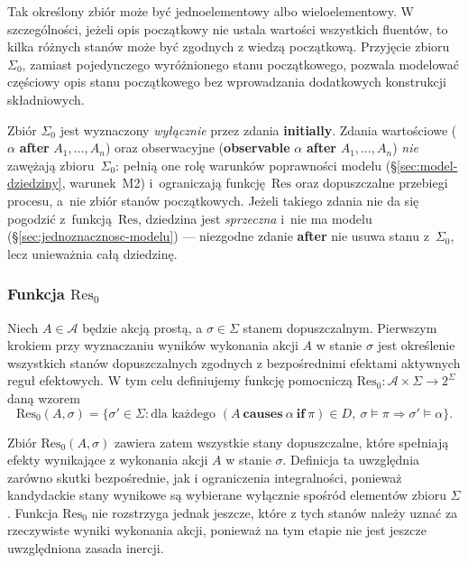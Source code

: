 \documentclass[11pt,a4paper]{article}
\newcommand{\aft}{\textbf{after}}
\newcommand{\initially}{\textbf{initially}}
\newcommand{\observable}{\textbf{observable}}
\theoremstyle{definition}
\begin{document}
Tak określony zbiór może być jednoelementowy albo wieloelementowy. W szczególności, jeżeli opis początkowy nie ustala wartości wszystkich fluentów, to kilka różnych stanów może być zgodnych z wiedzą początkową. Przyjęcie zbioru $\Sigma_0$, zamiast pojedynczego wyróżnionego stanu początkowego, pozwala modelować częściowy opis stanu początkowego bez wprowadzania dodatkowych konstrukcji składniowych.

Zbiór $\Sigma_0$ jest wyznaczony \emph{wyłącznie} przez zdania \initially{}. Zdania wartościowe ($\alpha$ \aft{} $A_1,\dots,A_n$) oraz obserwacyjne (\observable{} $\alpha$ \aft{} $A_1,\dots,A_n$) \emph{nie} zawężają zbioru~$\Sigma_0$: pełnią one rolę warunków poprawności modelu (\S\ref{sec:model-dziedziny}, warunek~M2) i~ograniczają funkcję~$\mathrm{Res}$ oraz dopuszczalne przebiegi procesu, a~nie zbiór stanów początkowych. Jeżeli takiego zdania nie da się pogodzić z~funkcją~$\mathrm{Res}$, dziedzina jest \emph{sprzeczna} i~nie ma modelu (\S\ref{sec:jednoznacznosc-modelu}) --- niezgodne zdanie \aft{} nie usuwa stanu z~$\Sigma_0$, lecz unieważnia całą dziedzinę.

\subsubsection{Funkcja \texorpdfstring{$\mathrm{Res}_0$}{Res0}}

Niech $A \in \mathcal{A}$ będzie akcją prostą, a $\sigma \in \Sigma$ stanem dopuszczalnym. Pierwszym krokiem przy wyznaczaniu wyników wykonania akcji $A$ w stanie $\sigma$ jest określenie wszystkich stanów dopuszczalnych zgodnych z bezpośrednimi efektami aktywnych reguł efektowych. W tym celu definiujemy funkcję pomocniczą $\mathrm{Res}_0 : \mathcal{A} \times \Sigma \to 2^{\Sigma}$ daną wzorem
\[
\mathrm{Res}_0(A,\sigma)=
\{\sigma' \in \Sigma :
\text{dla każdego } (A\ \textbf{causes}\ \alpha\ \textbf{if}\ \pi)\in D,\ 
\sigma \models \pi \Rightarrow \sigma' \models \alpha\}.
\]

Zbiór $\mathrm{Res}_0(A,\sigma)$ zawiera zatem wszystkie stany dopuszczalne, które spełniają efekty wynikające z wykonania akcji $A$ w stanie $\sigma$. Definicja ta uwzględnia zarówno skutki bezpośrednie, jak i ograniczenia integralności, ponieważ kandydackie stany wynikowe są wybierane wyłącznie spośród elementów zbioru $\Sigma$. Funkcja $\mathrm{Res}_0$ nie rozstrzyga jednak jeszcze, które z tych stanów należy uznać za rzeczywiste wyniki wykonania akcji, ponieważ na tym etapie nie jest jeszcze uwzględniona zasada inercji.
\end{document}
